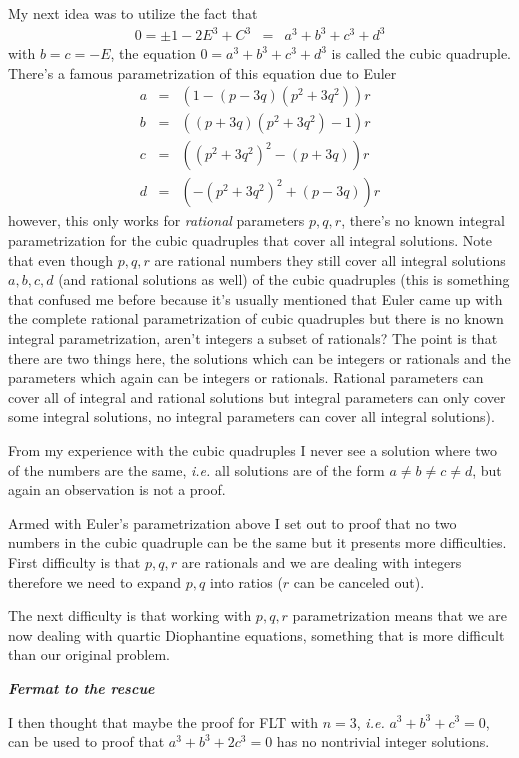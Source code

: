 \documentclass[aps,preprint,preprintnumbers,nofootinbib,showpacs,prd]{revtex4-1}
\newcommand{\ie}{{\it i.e.} }
\newcommand{\nbea}{\begin{eqnarray*}}
\newcommand{\neea}{\end{eqnarray*}}
\begin{document}
My next idea was to utilize the fact that
%
\nbea
0 = \pm 1 - 2E^3 + C^3 & = & a^3 + b^3 + c^3 + d^3
\neea
%
with $b = c = -E$, the equation $0 = a^3 + b^3 + c^3 + d^3$ is called the cubic quadruple. There's a famous parametrization of this equation due to Euler 
%
\nbea
a & = & (1-(p-3q)(p^2+3q^2))r \\
b & = & ((p+3q)(p^2+3q^2)-1)r \\
c & = & ((p^2+3q^2)^2-(p+3q))r \\
d & = & (-(p^2+3q^2)^2+(p-3q))r
\neea
%
however, this only works for {\it rational} parameters $p,q,r$, there's no known integral parametrization for the cubic quadruples that cover all integral solutions. Note that even though $p,q,r$ are rational numbers they still cover all integral solutions $a,b,c,d$ (and rational solutions as well) of the cubic quadruples (this is something that confused me before because it's usually mentioned that Euler came up with the complete rational parametrization of cubic quadruples but there is no known integral parametrization, aren't integers a subset of rationals? The point is that there are two things here, the solutions which can be integers or rationals and the parameters which again can be integers or rationals. Rational parameters can cover all of integral and rational solutions but integral parameters can only cover some integral solutions, no integral parameters can cover all integral solutions).

From my experience with the cubic quadruples I never see a solution where two of the numbers are the same, \ie all solutions are of the form $a\neq b\neq c\neq d$, but again an observation is not a proof.

Armed with Euler's parametrization above I set out to proof that no two numbers in the cubic quadruple can be the same but it presents more difficulties. First difficulty is that $p,q,r$ are rationals and we are dealing with integers therefore we need to expand $p,q$ into ratios ($r$ can be canceled out).

The next difficulty is that working with $p,q,r$ parametrization means that we are now dealing with quartic Diophantine equations, something that is more difficult than our original problem.

\bigskip
\textit{\textbf{Fermat to the rescue}}
\smallskip

I then thought that maybe the proof for FLT with $n=3$, \ie $a^3 + b^3 + c^3 = 0$, can be used to proof that $a^3 + b^3 + 2c^3 = 0$ has no nontrivial integer solutions.
\end{document}
